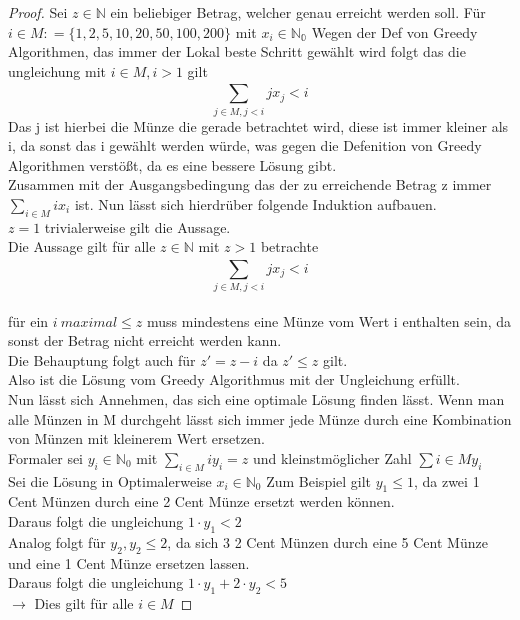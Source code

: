 \documentclass{report}
\begin{document}
\begin{proof}
	Sei $z \in \mathbb{N}$ ein beliebiger Betrag, welcher genau erreicht werden soll. Für $i \in M : = \{1,2,5,10,20,50,100,200\}$ mit $x_{i} \in \mathbb{N_{0}}$
	Wegen der Def von Greedy Algorithmen, das immer der Lokal beste Schritt gewählt wird folgt das die ungleichung mit $i \in M, i > 1$ gilt 
	$$ \sum_{j \in M, j < i}^{}jx_{j} < i  $$
	Das j ist hierbei die Münze die gerade betrachtet wird, diese ist immer kleiner als i, da sonst das i gewählt werden würde, was gegen die Defenition von Greedy Algorithmen verstößt, da es eine bessere Lösung gibt.\\
	Zusammen mit der Ausgangsbedingung das der zu erreichende Betrag z immer $\sum_{i \in M}^{}ix_{i}$ ist. Nun lässt sich hierdrüber folgende Induktion aufbauen.\\
	 $z = 1$ trivialerweise gilt die Aussage.\\ Die Aussage gilt für alle $z \in \mathbb{N}$ mit $z > 1$ betrachte $$ \sum_{j \in M, j < i}^{}jx_{j} < i  $$ \\ für ein $i \ maximal \leq z$ muss mindestens eine Münze vom Wert i enthalten sein, da sonst der Betrag nicht erreicht werden kann.\\
	Die Behauptung folgt auch für $z' = z - i$ da $z' \leq z$ gilt.\\ 
	Also ist die Lösung vom Greedy Algorithmus mit der Ungleichung erfüllt.\\
	Nun lässt sich Annehmen, das sich eine optimale Lösung finden lässt. Wenn man alle Münzen in M durchgeht lässt sich immer jede Münze durch eine Kombination von Münzen mit kleinerem Wert ersetzen.\\
	Formaler sei $y_{i} \in \mathbb{N}_{0}$ mit $ \sum_{i \in M} iy_{i} = z $ und kleinstmöglicher Zahl $\sum{i \in M} y_{i}$\\
	Sei die Lösung in Optimalerweise $x_{i} \in \mathbb{N}_{0}$ Zum Beispiel gilt $y_{1} \leq 1$, da zwei 1 Cent Münzen durch eine 2 Cent Münze ersetzt werden können.\\
	Daraus folgt die ungleichung $1 \cdot y_{1} < 2$\\
	Analog folgt für $y_{2}, y_{2} \leq 2$, da sich 3 2 Cent Münzen durch eine 5 Cent Münze und eine 1 Cent Münze ersetzen lassen.\\
	Daraus folgt die ungleichung $1 \cdot y_{1} + 2 \cdot y_{2} < 5$\\ $\rightarrow$ Dies gilt für alle $i \in M$
\end{proof} 
\end{document}
